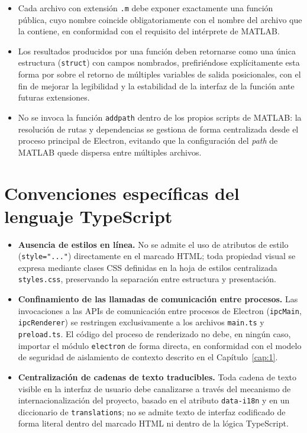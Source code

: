 \begin{itemize}
    \item Cada archivo con extensi\'on \texttt{.m} debe exponer exactamente
    una funci\'on p\'ublica, cuyo nombre coincide obligatoriamente con el
    nombre del archivo que la contiene, en conformidad con el requisito del
    int\'erprete de MATLAB.
    \item Los resultados producidos por una funci\'on deben retornarse como
    una \'unica estructura (\texttt{struct}) con campos nombrados,
    prefiri\'endose expl\'icitamente esta forma por sobre el retorno de
    m\'ultiples variables de salida posicionales, con el fin de mejorar la
    legibilidad y la estabilidad de la interfaz de la funci\'on ante
    futuras extensiones.
    \item No se invoca la funci\'on \texttt{addpath} dentro de los propios
    scripts de MATLAB: la resoluci\'on de rutas y dependencias se gestiona de
    forma centralizada desde el proceso principal de Electron, evitando que
    la configuraci\'on del \emph{path} de MATLAB quede dispersa entre
    m\'ultiples archivos.
\end{itemize}

\section{Convenciones espec\'ificas del lenguaje TypeScript}

\begin{itemize}
    \item \textbf{Ausencia de estilos en l\'inea.} No se admite el uso de
    atributos de estilo (\texttt{style="..."}) directamente en el marcado
    HTML; toda propiedad visual se expresa mediante clases CSS definidas en
    la hoja de estilos centralizada \texttt{styles.css}, preservando la
    separaci\'on entre estructura y presentaci\'on.
    \item \textbf{Confinamiento de las llamadas de comunicaci\'on entre
    procesos.} Las invocaciones a las APIs de comunicaci\'on entre procesos
    de Electron (\texttt{ipcMain}, \texttt{ipcRenderer}) se restringen
    exclusivamente a los archivos \texttt{main.ts} y \texttt{preload.ts}. El
    c\'odigo del proceso de renderizado no debe, en ning\'un caso, importar
    el m\'odulo \texttt{electron} de forma directa, en conformidad con el
    modelo de seguridad de aislamiento de contexto descrito en el
    Cap\'itulo~\ref{cap:1}.
    \item \textbf{Centralizaci\'on de cadenas de texto traducibles.} Toda
    cadena de texto visible en la interfaz de usuario debe canalizarse a
    trav\'es del mecanismo de internacionalizaci\'on del proyecto, basado en
    el atributo \texttt{data-i18n} y en un diccionario de
    \texttt{translations}; no se admite texto de interfaz codificado de
    forma literal dentro del marcado HTML ni dentro de la l\'ogica
    TypeScript.
\end{itemize}
